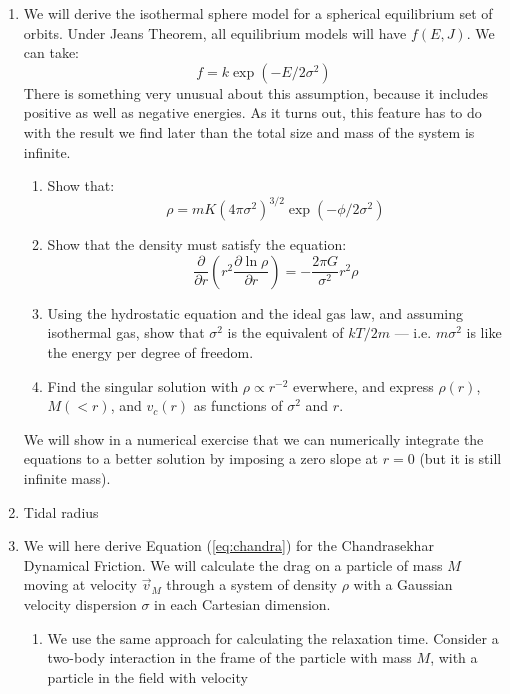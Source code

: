 \begin{enumerate}
\begin{enumerate}
\end{enumerate}
\item We will derive the isothermal sphere model for a spherical
equilibrium set of orbits. Under Jeans Theorem, all equilibrium models
will have $f(E,J)$.  We can take:
\begin{equation}
f = 
k \exp\left(-E/2\sigma^2\right)
\end{equation}
There is something very unusual about this assumption, because it
includes positive as well as negative energies. As it turns out, this
feature has to do with the result we find later than the total size
and mass of the system is infinite. 
\begin{enumerate}
\item Show that:
\begin{equation}
\rho = m K \left(4\pi\sigma^2\right)^{3/2} \exp\left(-\phi/2 \sigma^2\right)
\end{equation}
\item Show that the density must satisfy the equation:
\begin{equation}
\label{eq:lane-emden}
\frac{\partial}{\partial
r} \left(r^2 \frac{\partial \ln \rho}{\partial r} \right) =
- \frac{2\pi G}{\sigma^2} r^2 \rho
\end{equation}
\item Using the hydrostatic equation and the ideal gas law, and
assuming isothermal gas, show that $\sigma^2$ is the equivalent of
$kT/2m$ --- i.e. $m\sigma^2$ is like the energy per degree of freedom.
\item Find the singular solution with $\rho\propto r^{-2}$ everwhere,
and express $\rho(r)$, $M(<r)$, and $v_c(r)$ as functions of
$\sigma^2$ and $r$.
\end{enumerate}
We will show in a  numerical exercise that we can numerically integrate
the equations to a better solution by imposing a zero slope at $r=0$
(but it is still infinite mass).
\item Tidal radius
\item We will here derive Equation (\ref{eq:chandra}) for the
Chandrasekhar Dynamical Friction. We will calculate the drag on a
particle of mass $M$ moving at velocity $\vec{v}_M$ through a system
of density $\rho$ with a Gaussian velocity dispersion $\sigma$ in each
Cartesian dimension.
\begin{enumerate}
\item We use the same approach for calculating the relaxation
time. Consider a two-body interaction in the frame of the particle
with mass $M$, with a particle in the field with velocity

\end{enumerate}
\end{enumerate}
